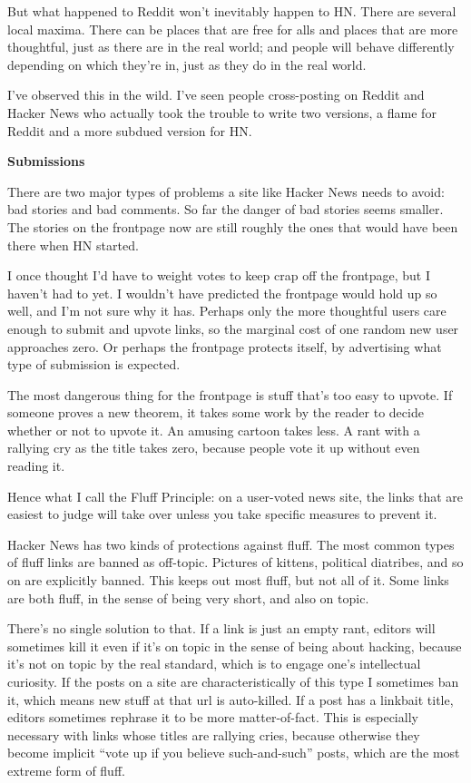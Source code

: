 But what happened to Reddit won't inevitably happen to HN. There are
several local maxima. There can be places that are free for alls and
places that are more thoughtful, just as there are in the real world;
and people will behave differently depending on which they're in, just
as they do in the real world.

I've observed this in the wild. I've seen people cross-posting on Reddit
and Hacker News who actually took the trouble to write two versions, a
flame for Reddit and a more subdued version for HN.

\textbf{Submissions}

There are two major types of problems a site like Hacker News needs to
avoid: bad stories and bad comments. So far the danger of bad stories
seems smaller. The stories on the frontpage now are still roughly the
ones that would have been there when HN started.

I once thought I'd have to weight votes to keep crap off the frontpage,
but I haven't had to yet. I wouldn't have predicted the frontpage would
hold up so well, and I'm not sure why it has. Perhaps only the more
thoughtful users care enough to submit and upvote links, so the marginal
cost of one random new user approaches zero. Or perhaps the frontpage
protects itself, by advertising what type of submission is expected.

The most dangerous thing for the frontpage is stuff that's too easy to
upvote. If someone proves a new theorem, it takes some work by the
reader to decide whether or not to upvote it. An amusing cartoon takes
less. A rant with a rallying cry as the title takes zero, because people
vote it up without even reading it.

Hence what I call the Fluff Principle: on a user-voted news site, the
links that are easiest to judge will take over unless you take specific
measures to prevent it.

Hacker News has two kinds of protections against fluff. The most common
types of fluff links are banned as off-topic. Pictures of kittens,
political diatribes, and so on are explicitly banned. This keeps out
most fluff, but not all of it. Some links are both fluff, in the sense
of being very short, and also on topic.

There's no single solution to that. If a link is just an empty rant,
editors will sometimes kill it even if it's on topic in the sense of
being about hacking, because it's not on topic by the real standard,
which is to engage one's intellectual curiosity. If the posts on a site
are characteristically of this type I sometimes ban it, which means new
stuff at that url is auto-killed. If a post has a linkbait title,
editors sometimes rephrase it to be more matter-of-fact. This is
especially necessary with links whose titles are rallying cries, because
otherwise they become implicit ``vote up if you believe such-and-such''
posts, which are the most extreme form of fluff.

